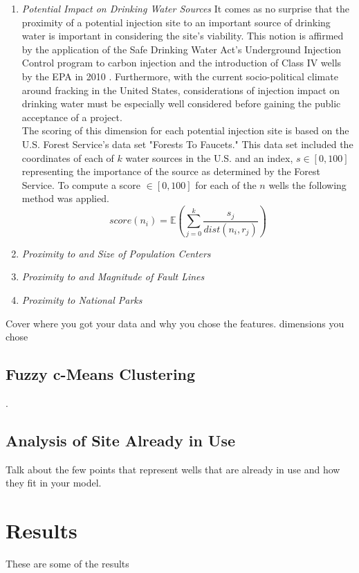 \documentclass[a4paper, 12pt]{article}
\begin{document}
\begin{enumerate}
\item \emph{Potential Impact on Drinking Water Sources} It comes as no surprise that the proximity of a potential injection site to an important source of drinking water is important in considering the site's viability.  This notion is affirmed by the application of the Safe Drinking Water Act's Underground Injection Control program to carbon injection and the introduction of Class IV wells by the EPA in 2010 \cite{natcarb_risk}. Furthermore, with the current socio-political climate around fracking in the United States, considerations of injection impact on drinking water must be especially well considered before gaining the public acceptance of a project. \\
The scoring of this dimension for each potential injection site is based on the U.S. Forest Service's data set "Forests To Faucets." This data set included the coordinates of each of $k$ water sources in the U.S. and an index, $s \in [0, 100]$ representing the importance of the source as determined by the Forest Service. To compute a score $\in [0, 100]$ for each of the $n$ wells the following method was applied. 
$$score(n_i) =  \mathbb{E}(\sum_{j=0}^k \frac{s_j}{dist(n_i, r_j)})$$

\item \emph{Proximity to and Size of Population Centers} 

\item \emph{Proximity to and Magnitude of Fault Lines}

\item \emph{Proximity to National Parks}
\end{enumerate} 

Cover where you got your data and why you chose the features. dimensions you chose



\subsection{Fuzzy c-Means Clustering}\label{fuzz}.


\subsection{Analysis of Site Already in Use}
Talk about the few points that represent wells that are already in use and how they fit in your model. 


\section{Results}
These are some of the results
\end{document}
